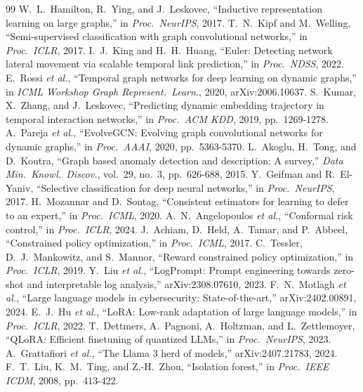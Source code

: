 \documentclass[journal,10pt,twocolumn]{IEEEtran}
\begin{document}
\begin{thebibliography}{99}
 W.~L.~Hamilton, R.~Ying, and J.~Leskovec, ``Inductive representation learning on large graphs,'' in \emph{Proc.\ NeurIPS}, 2017.
 T.~N.~Kipf and M.~Welling, ``Semi-supervised classification with graph convolutional networks,'' in \emph{Proc.\ ICLR}, 2017.
 I.~J.~King and H.~H.~Huang, ``Euler: Detecting network lateral movement via scalable temporal link prediction,'' in \emph{Proc.\ NDSS}, 2022.
 E.~Rossi \emph{et al.}, ``Temporal graph networks for deep learning on dynamic graphs,'' in \emph{ICML Workshop Graph Represent.\ Learn.}, 2020, arXiv:2006.10637.
 S.~Kumar, X.~Zhang, and J.~Leskovec, ``Predicting dynamic embedding trajectory in temporal interaction networks,'' in \emph{Proc.\ ACM KDD}, 2019, pp.~1269-1278.
 A.~Pareja \emph{et al.}, ``EvolveGCN: Evolving graph convolutional networks for dynamic graphs,'' in \emph{Proc.\ AAAI}, 2020, pp.~5363-5370.
 L.~Akoglu, H.~Tong, and D.~Koutra, ``Graph based anomaly detection and description: A survey,'' \emph{Data Min.\ Knowl.\ Discov.}, vol.~29, no.~3, pp.~626-688, 2015.
 Y.~Geifman and R.~El-Yaniv, ``Selective classification for deep neural networks,'' in \emph{Proc.\ NeurIPS}, 2017.
 H.~Mozannar and D.~Sontag, ``Consistent estimators for learning to defer to an expert,'' in \emph{Proc.\ ICML}, 2020.
 A.~N.~Angelopoulos \emph{et al.}, ``Conformal risk control,'' in \emph{Proc.\ ICLR}, 2024.
 J.~Achiam, D.~Held, A.~Tamar, and P.~Abbeel, ``Constrained policy optimization,'' in \emph{Proc.\ ICML}, 2017.
 C.~Tessler, D.~J.~Mankowitz, and S.~Mannor, ``Reward constrained policy optimization,'' in \emph{Proc.\ ICLR}, 2019.
 Y.~Liu \emph{et al.}, ``LogPrompt: Prompt engineering towards zero-shot and interpretable log analysis,'' arXiv:2308.07610, 2023.
 F.~N.~Motlagh \emph{et al.}, ``Large language models in cybersecurity: State-of-the-art,'' arXiv:2402.00891, 2024.
 E.~J.~Hu \emph{et al.}, ``LoRA: Low-rank adaptation of large language models,'' in \emph{Proc.\ ICLR}, 2022.
 T.~Dettmers, A.~Pagnoni, A.~Holtzman, and L.~Zettlemoyer, ``QLoRA: Efficient finetuning of quantized LLMs,'' in \emph{Proc.\ NeurIPS}, 2023.
 A.~Grattafiori \emph{et al.}, ``The Llama 3 herd of models,'' arXiv:2407.21783, 2024.
 F.~T.~Liu, K.~M.~Ting, and Z.-H.~Zhou, ``Isolation forest,'' in \emph{Proc.\ IEEE ICDM}, 2008, pp.~413-422.
\end{thebibliography}
\end{document}
